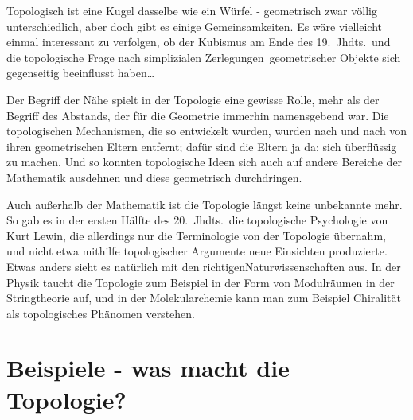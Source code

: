 \documentclass[12pt]{book}   %
\begin{document}
Topologisch ist eine Kugel dasselbe wie ein W\"urfel - geometrisch zwar 
v\"ollig unterschiedlich, aber doch gibt es einige Gemeinsamkeiten. 
Es w\"are vielleicht einmal interessant zu verfolgen, ob der Kubismus am Ende
des 19.\ Jhdts.\ und die topologische Frage nach \glqq simplizialen 
Zerlegungen\grqq\ geometrischer Objekte sich gegenseitig beeinflusst haben\dots

Der Begriff der N\"ahe spielt in der Topologie eine gewisse Rolle, mehr als der
Begriff des Abstands, der f\"ur die Geometrie immerhin namensgebend war.
Die topologischen 
Mechanismen, die so entwickelt wurden, wurden nach und nach von ihren 
geometrischen Eltern entfernt; daf\"ur sind die Eltern ja da: sich 
\"uberfl\"ussig zu machen. Und so konnten topologische Ideen sich auch auf 
andere Bereiche der Mathematik ausdehnen und diese geometrisch durchdringen.

Auch au\ss erhalb der Mathematik ist die Topologie l\"angst keine unbekannte
mehr. So gab es in der ersten H\"alfte des 20.\ Jhdts.\ die topologische 
Psychologie von Kurt Lewin, die allerdings nur die Terminologie von der 
Topologie \"ubernahm, und nicht etwa mithilfe topologischer Argumente neue
Einsichten produzierte. Etwas anders sieht es nat\"urlich mit den 
\glqq richtigen\grqq Naturwissenschaften aus. In der Physik taucht
die Topologie zum Beispiel in der Form von Modulr\"aumen in der Stringtheorie 
auf, und in der Molekularchemie kann man zum Beispiel Chiralit\"at als
topologisches Ph\"anomen verstehen.



\section{Beispiele - was macht die Topologie?}
\end{document}
